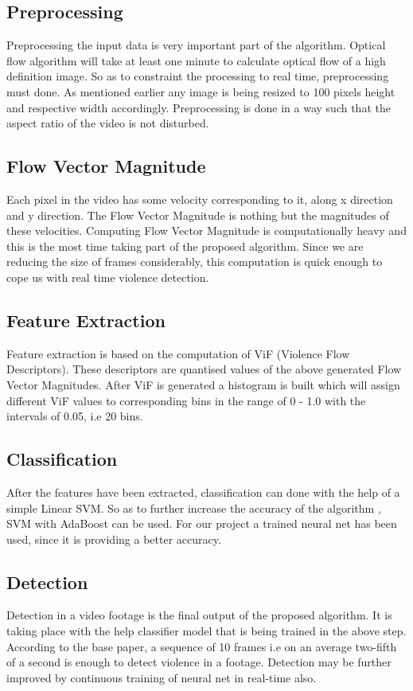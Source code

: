 \subsection{Preprocessing}
Preprocessing the input data is very important part of the algorithm. Optical flow algorithm will take at least one minute to calculate optical flow of a high definition image. So as to constraint the processing to real time, preprocessing must done. As mentioned earlier any image is being resized to 100 pixels height and respective width accordingly. Preprocessing is done in a way such that the aspect ratio of the video is not disturbed.
\subsection{Flow Vector Magnitude}
Each pixel in the video has some velocity corresponding to it, along x direction and y direction. The Flow Vector Magnitude is nothing but the magnitudes of these velocities. Computing Flow Vector Magnitude is computationally heavy and this is the most time taking part of the proposed algorithm. Since we are reducing the size of frames considerably, this computation is quick enough to cope us with real time violence detection.
\subsection{Feature Extraction}
Feature extraction is based on the computation of ViF (Violence Flow Descriptors). These descriptors are quantised values of the above generated Flow Vector Magnitudes. After ViF is generated a histogram is built which will assign different ViF values to corresponding bins in the range of 0 - 1.0 with the intervals of 0.05, i.e 20 bins.
\subsection{Classification}
After the features have been extracted, classification can done with the help of a simple Linear SVM. So as to further increase the accuracy of the algorithm , SVM with AdaBoost can be used. For our project a trained neural net has been used, since it is providing a better accuracy.
\subsection{Detection}
Detection in a video footage is the final output of the proposed algorithm. It is taking place with the help classifier model that is being trained in the above step. According to the base paper, a sequence of 10 frames i.e on an average two-fifth of a second is enough to detect violence in a footage. Detection may be further improved by continuous training of neural net in real-time also.
